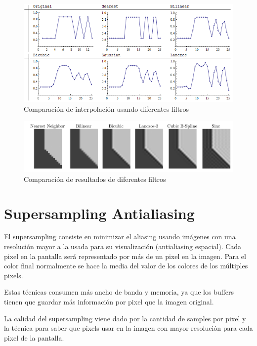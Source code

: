 \documentclass[withindex, glossary]{cam-thesis}
\begin{document}
\begin{figure}
    \includegraphics[width=\linewidth]{figures/Lw6ei.png}
    \caption{Comparación de interpolación usando diferentes filtros\cite{gis}}
    \label{gls}
\end{figure}

\begin{figure}
    \includegraphics[width=\linewidth]{figures/comparison-filter.png}
    \caption{Comparación de resultados de diferentes filtros\cite{resampling2}}
\end{figure}

\section{Supersampling Antialiasing}

El supersampling consiste en minimizar el aliasing usando imágenes con una resolución mayor a la usada para su visualización (antialiasing espacial). Cada pixel en la pantalla será representado por más de un pixel en la imagen. Para el color final normalmente se hace la media del valor de los colores de los múltiples pixels.

Estas técnicas consumen más ancho de banda y memoria, ya que los buffers tienen que guardar más información por pixel que la imagen original.

La calidad del supersampling viene dado por la cantidad de samples por pixel y la técnica para saber que pixels usar en la imagen con mayor resolución para cada pixel de la pantalla.

\end{document}
